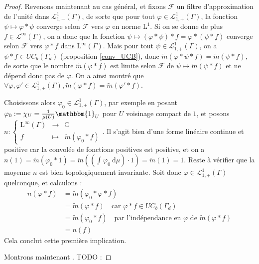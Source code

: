 \documentclass[a4paper,12pt]{article}
\newcommand{\C}{\mathbb{C}}
\newcommand{\indic}{\mathbbm{1}}
\newcommand{\integral}[4]{\int_{#1}^{#2} #3~\mathrm{d}#4}
\newcommand\fundef[3]{#1: \left\{\begin{array}{ccc}#2\\#3\end{array}\right.}
\renewcommand{\implies}{\Rightarrow}
\newcommand{\TODO}[1]{{\color{red}TODO :} #1}
\begin{document}
\begin{proof}
    Revenons maintenant au cas général, et fixons $\mathscr{F}$ un filtre d'approximation de l'unité 
    dans $\mathscr{L}^1_{1, +}(\Gamma)$, de sorte que pour tout $\varphi\in\mathscr{L}^1_{1, +}(\Gamma)$, la fonction 
    $\psi\mapsto\varphi\ast\psi$ converge selon $\mathscr{F}$ vers $\varphi$ en norme $\mathrm{L}^1$. 
    Si on se donne de plus $f\in\mathscr{L}^\infty(\Gamma)$, on a donc que la fonction $\psi\mapsto(\varphi\ast\psi)\ast f = \varphi\ast(\psi\ast f)$
    converge selon $\mathscr{F}$ vers $\varphi\ast f$ dans $\mathrm{L}^\infty(\Gamma)$. Mais pour tout $\psi\in\mathscr{L}^1_{1, +}(\Gamma)$, on
    a $\psi\ast f\in UC_b(\Gamma_d)$ (proposition \ref{conv_UCB}), donc $\widetilde{m}(\varphi\ast\psi\ast f) = \widetilde{m}(\psi\ast f)$,
    de sorte que le nombre $\widetilde{m}(\varphi\ast f)$ est limite selon $\mathscr{F}$ de $\psi\mapsto\widetilde{m}(\psi\ast f)$ et 
    ne dépend donc pas de $\varphi$. On a ainsi montré que $\forall\varphi, \varphi'\in\mathscr{L}^1_{1, +}(\Gamma), \widetilde{m}(\varphi\ast f) = \widetilde{m}(\varphi'\ast f)$.

    Choisissons alors $\varphi_0\in\mathscr{L}^1_{1, +}(\Gamma)$, par exemple en posant $\varphi_0:=\chi_U=\frac{1}{\mu(U)}\indic_U$ pour 
    $U$ voisinage compact de $1$, et posons $\fundef{n}{\mathrm{L}^\infty(\Gamma)&\to&\C}{f&\mapsto&\widetilde{m}(\varphi_0\ast f)}$. Il s'agit bien d'une 
    forme linéaire continue et positive car la convolée de fonctions positives est positive, et on a $n(1)=\widetilde{m}(\varphi_0\ast 1) = \widetilde{m}\left(\left(\integral{}{}{\varphi_0}{\mu}\right)\cdot 1\right) = \widetilde{m}(1) = 1$.
    Reste à vérifier que la moyenne $n$ est bien topologiquement invariante. Soit donc $\varphi\in\mathscr{L}^1_{1, +}(\Gamma)$ quelconque, et calculons :
    \begin{align*}
        n(\varphi\ast f) 
            &= \widetilde{m}(\varphi_0\ast\varphi\ast f) \\
            &= \widetilde{m}(\varphi\ast f) \quad\text{car } \varphi\ast f\in UC_b(\Gamma_d)\\
            &= \widetilde{m}(\varphi_0\ast f) \quad\text{par l'indépendance en $\varphi$ de $\widetilde{m}(\varphi\ast f)$} \\
            &= n(f)
    \end{align*}
    Cela conclut cette première implication. 

    Montrons maintenant \framebox{$(\ref{amenable_TFAE/topological_mean})\implies(\ref{amenable_TFAE/strong_Reiter})$}. \TODO{}


\end{proof}
\end{document}
